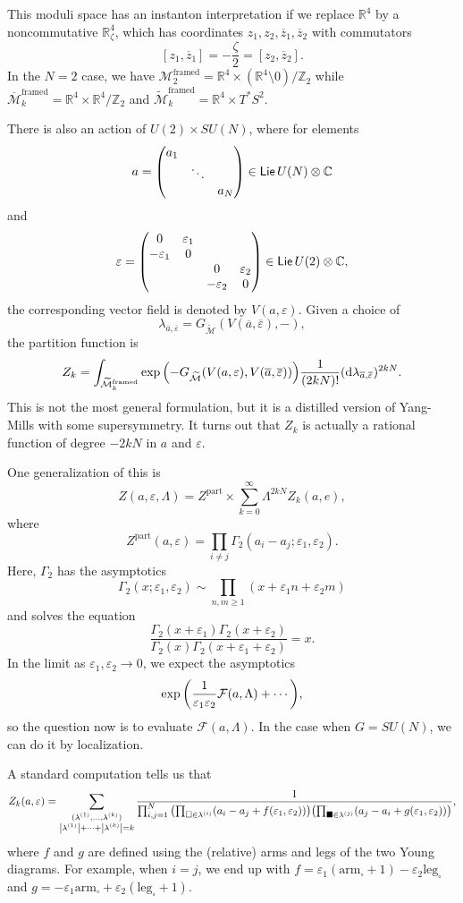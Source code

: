 \documentclass[leqno, openany]{memoir}
\theoremstyle{definition}
\theoremstyle{remark}
\theoremstyle{plain}
\theoremstyle{definition}
\theoremstyle{remark}
\newcommand{\R}{\mathbb{R}}
\newcommand{\C}{\mathbb{C}}
\newcommand{\Z}{\mathbb{Z}}
\newcommand{\ep}{\varepsilon}
\newcommand{\mc}[1]{\mathcal{#1}}
\newcommand{\mr}[1]{\mathrm{#1}}
\newcommand{\ms}[1]{\mathsf{#1}}
\newcommand{\on}[1]{\operatorname{#1}}
\newcommand{\ol}[1]{\overline{#1}}
\newcommand{\wt}[1]{\widetilde{#1}}
\begin{document}
This moduli space has an instanton interpretation if we replace $\R^4$ by a noncommutative $\R^4_{\zeta}$, which has coordinates $z_1, z_2, \ol{z}_1, \ol{z}_2$ with commutators
\[ [z_1, \ol{z}_1] = -\frac{\zeta}{2} = [z_2, \ol{z}_2]. \]
In the $N=2$ case, we have $\mc{M}_2^{\mr{framed}} = \R^4 \times (\R^4 \setminus 0)/\Z_2$ while $\ol{\mc{M}}_k^{\mr{framed}} = \R^4 \times \R^4/\Z_2$ and $\wt{\mc{M}}_k^{\mr{framed}} = \R^4 \times T^* S^2$.

There is also an action of $U(2) \times SU(N)$, where for elements
\[ a = \mqty(\dmat{a_1,\ddots,a_N}) \in \on{\ms{Lie}} U(N) \otimes \C \]
and
\[\ep = \mqty(0 & \ep_1 \\ -\ep_1 & 0 \\ & & 0 & \ep_2 \\ & & -\ep_2 & 0) \in \on{\ms{Lie}} U(2) \otimes \C, \]
the corresponding vector field is denoted by $V(a,\ep)$. Given a choice of
\[ \lambda_{\ol{a}, \ol{\ep}} = G_{\wt{\mc{M}}}(V(\ol{a}, \ol{\ep}), -), \]
the partition function is
\[ Z_k = \int_{\wt{\mc{M}}_k^{\mr{framed}}} \exp \qty(-G_{\wt{\mc{M}}}(V(a,\ep), V(\ol{a}, \ol{\ep}))) \frac{1}{(2kN)!} (\dd \lambda_{\ol{a}, \ol{\ep}})^{2kN}. \]
This is not the most general formulation, but it is a distilled version of Yang-Mills with some supersymmetry. It turns out that $Z_k$ is actually a rational function of degree $-2kN$ in $a$ and $\ep$.

One generalization of this is
\[ Z(a,\ep,\Lambda) = Z^{\mr{part}} \times \sum_{k=0}^{\infty} \Lambda^{2kN} Z_k(a,e), \]
where
\[ Z^{\mr{part}}(a,\ep) = \prod_{i \neq j} \Gamma_2(a_i-a_j; \ep_1, \ep_2). \]
Here, $\Gamma_2$ has the asymptotics
\[ \Gamma_2(x; \ep_1, \ep_2) \sim \prod_{n,m \geq 1}(x+\ep_1 n + \ep_2 m) \]
and solves the equation
\[ \frac{\Gamma_2(x+\ep_1) \Gamma_2(x+\ep_2)}{\Gamma_2(x) \Gamma_2(x+\ep_1+\ep_2)} = x. \]
In the limit as $\ep_1, \ep_2 \to 0$, we expect the asymptotics
\[ \exp\qty(\frac{1}{\ep_1 \ep_2} \mc{F}(a,\Lambda) + \cdots), \]
so the question now is to evaluate $\mc{F}(a, \Lambda)$. In the case when $G = SU(N)$, we can do it by localization.

A standard computation tells us that
\[ Z_k(a,\ep) = \sum_{\substack{(\lambda^{(1)}, \ldots, \lambda^{(k)}) \\ \abs{\lambda^{(1)}} + \cdots + \abs{\lambda^{(k)}} = k}} \frac{1}{\prod_{i,j=1}^N \qty( \prod_{\square \in \lambda^{(i)}} (a_i-a_j + f(\ep_1, \ep_2))) \qty(\prod_{\blacksquare \in \lambda^{(j)}} ( a_j - a_i + g(\ep_1, \ep_2) ))}, \]
where $f$ and $g$ are defined using the (relative) arms and legs of the two Young diagrams. For example, when $i=j$, we end up with $f = \ep_1(\mr{arm}_{\square}+1)-\ep_2 \mr{leg}_{\square}$ and $g = -\ep_1 \mr{arm}_{\square} + \ep_2(\mr{leg}_{\square}+1)$.
\end{document}
